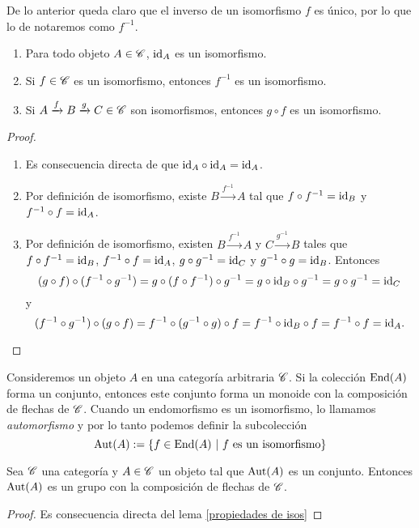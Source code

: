\documentclass{comunicaciones}
\begin{document}
De lo anterior queda claro que el inverso de un isomorfismo $f$ es único, por lo que lo de notaremos como $f^{-1}$. 
\begin{lem}\label{propiedades de isos}
    \begin{enumerate} \text{\\}
        \item Para todo objeto $A\in\mathscr C$, $\mathrm{id}_A$ es un isomorfismo.
        \item Si $f\in\mathscr C$ es un isomorfismo, entonces $f^{-1}$ es un isomorfismo.
        \item Si $A\xrightarrow{f}B\xrightarrow{g}C\in\mathscr C$ son isomorfismos, entonces $g\circ f$ es un isomorfismo.
    \end{enumerate}
\end{lem}
\begin{proof}\text{\\}
    \begin{enumerate}
        \item Es consecuencia directa de que $\mathrm{id}_A\circ\mathrm{id}_A=\mathrm{id}_A$.
        \item Por definición de isomorfismo, existe $B\xrightarrow{f^{-1}}A$ tal que $f\circ f^{-1}=\mathrm{id}_B$ y $f^{-1}\circ f=\mathrm{id}_A$.
        \item Por definición de isomorfismo, existen $B\xrightarrow{f^{-1}}A$ y $C\xrightarrow{g^{-1}}B$ tales que $f\circ f^{-1}=\mathrm{id}_B$, $f^{-1}\circ f=\mathrm{id}_A$, $g\circ g^{-1}=\mathrm{id}_C$ y $g^{-1}\circ g=\mathrm{id}_B$. Entonces
        $$(g\circ f)\circ(f^{-1}\circ g^{-1})=g\circ(f\circ f^{-1})\circ g^{-1}=g\circ\mathrm{id}_B\circ g^{-1}=g\circ g^{-1}=\mathrm{id}_C$$
        y
        $$(f^{-1}\circ g^{-1})\circ(g\circ f)=f^{-1}\circ(g^{-1}\circ g)\circ f=f^{-1}\circ\mathrm{id}_B\circ f=f^{-1}\circ f=\mathrm{id}_A.$$
    \end{enumerate}
\end{proof}

Consideremos un objeto $A$ en una categoría arbitraria $\mathscr C$. Si la colección $\mathrm{End}(A)$ forma un conjunto, entonces este conjunto forma un monoide
con la composición de flechas de $\mathscr C$. Cuando un endomorfismo es un isomorfismo, lo llamamos \emph{automorfismo} y por lo tanto podemos definir la subcolección
$$\mathrm{Aut}(A):=\{f\in\mathrm{End}(A) \ |\ f \text{ es un isomorfismo}\}$$

\begin{thm}
    Sea $\mathscr C$ una categoría y $A\in\mathscr C$ un objeto tal que $\mathrm{Aut}(A)$ es un conjunto. Entonces $\mathrm{Aut}(A)$ es un grupo con la composición de flechas de $\mathscr C$.
\end{thm}
\begin{proof}
    Es consecuencia directa del lema \ref{propiedades de isos}
\end{proof}
\end{document}
